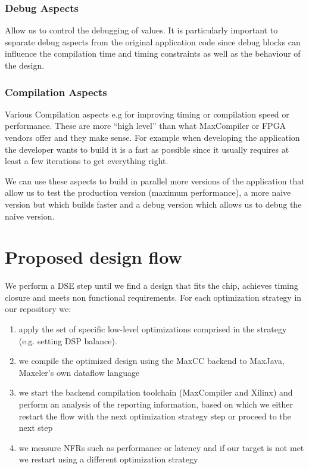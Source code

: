 \subsubsection{Debug Aspects}

Allow us to  control the debugging of values. It is particularly
important to separate debug aspects from the original application code
since debug blocks can influence the compilation time and timing
constraints as well as the behaviour of the design.


\subsubsection{Compilation Aspects}

Various Compilation aspects e.g for improving timing or
compilation speed or performance. These are more “high level”
than what MaxCompiler or FPGA vendors offer and they make
sense.  For example when developing the application the
developer wants to build it is a fast as possible since it
usually requires at least a few iterations to get everything
right.

We can use these aspects to build in parallel more versions of the
application that allow us to test the production version (maximum
performance), a more naive version but which builds faster and a debug
version which allows us to debug the naive version.



\section{Proposed design flow}

We perform a DSE step until we find a design that fits the chip,
achieves timing closure and meets non functional requirements.  For
each optimization strategy in our repository we:

\begin{enumerate}

\item apply the set of specific low-level optimizations comprised in
  the strategy (e.g. setting DSP balance).

\item  we compile the optimized
  design using the MaxCC backend to MaxJava, Maxeler's own dataflow
  language

\item we start the backend compilation toolchain (MaxCompiler
  and Xilinx) and perform an analysis of the reporting information,
  based on which we either restart the flow with the next optimization
  strategy step or proceed to the next step

\item we measure NFRs such as performance or latency and if our target
  is not met we restart using a different optimization strategy

\end{enumerate}

